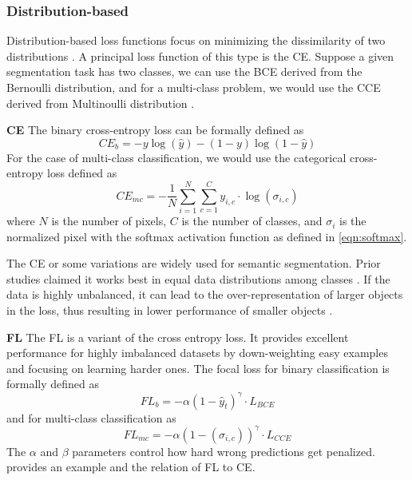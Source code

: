 \subsubsection*{Distribution-based}
Distribution-based loss functions focus on minimizing the dissimilarity of two distributions \cite{https://doi.org/10.48550/arxiv.2005.13449}. A principal loss function of this type is the \acf{CE}. Suppose a given segmentation task has two classes, we can use the \ac{BCE} derived from the Bernoulli distribution, and for a multi-class problem, we would use the \ac{CCE} derived from Multinoulli distribution \cite{Jadon_2020}.

\textbf{\acf{CE}}\newline
The binary cross-entropy loss can be formally defined as
\begin{equation}
    CE_{b}=-y\log(\hat{y})-(1-y)\log(1-\hat{y})
\end{equation}
For the case of multi-class classification, we would use the categorical cross-entropy loss defined as
\begin{equation}
    CE_{mc}=-\frac{1}{N}\sum_{i=1}^{N}\sum_{c=1}^C y_{i,c}\cdot \log(\sigma_{i,c})
    \label{eqn:CCE}
\end{equation}
where $N$ is the number of pixels, $C$ is the number of classes, and $\sigma_i$ is the normalized pixel with the softmax activation function as defined in \ref{eqn:softmax}.

The \ac{CE} or some variations are widely used for semantic segmentation. Prior studies claimed it works best in equal data distributions among classes \cite{Jadon_2020}. If the data is highly unbalanced, it can lead to the over-representation of larger objects in the loss, thus resulting in lower performance of smaller objects \cite{YEUNG2022102026}.

\textbf{\acf{FL}}\newline
\label{subsubsec:focal_loss}
The \ac{FL} \cite{lin2017focal} is a variant of the cross entropy loss. It provides excellent performance for highly imbalanced datasets by down-weighting easy examples and focusing on learning harder ones. The focal loss for binary classification is formally defined as
\begin{equation}
    FL_{b}=-\alpha(1-\hat{y}_t)^\gamma \cdot L_{BCE}
\end{equation}
and for multi-class classification as
\begin{equation}
    FL_{mc}=-\alpha(1-(\sigma_{i,c}))^\gamma \cdot L_{CCE}
\end{equation}
The $\alpha$ and $\beta$ parameters control how hard wrong predictions get penalized.  provides an example and the relation of \ac{FL} to \ac{CE}.


